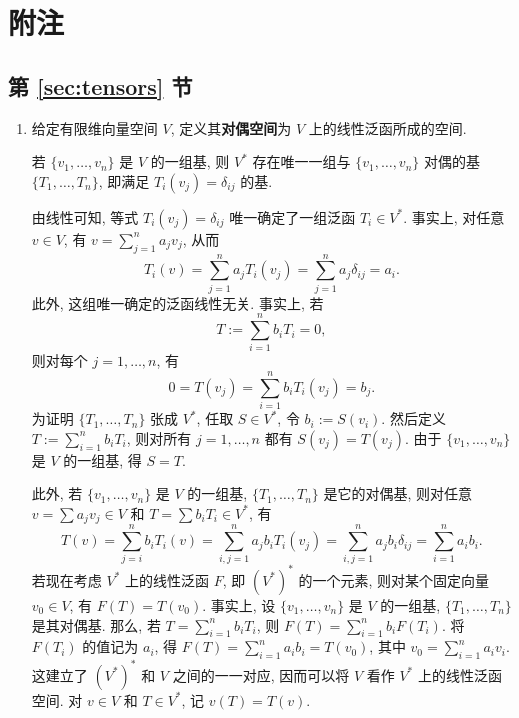 \section{附注}\label{sec:notes-on-differential-forms}

\subsection{第 \ref{sec:tensors} 节}\label{subsec:notes-tensors}
\begin{enumerate}[label=(\arabic*),leftmargin=*]
\item 给定有限维向量空间 $V$, 定义其\textbf{对偶空间}为 $V$ 上的线性泛函所成的空间.

\begin{RiemannProposition}\label{prop:existence-and-uniqueness-of-dual-basis}
若 $\{v_1,\ldots,v_n\}$ 是 $V$ 的一组基, 则 $V^*$ 存在唯一一组与 $\{v_1,\ldots,v_n\}$ 对偶的基 $\{T_1,\ldots,T_n\}$, 即满足 $T_i(v_j)=\delta_{ij}$ 的基.
\end{RiemannProposition}

\begin{RiemannProof}
由线性可知, 等式 $T_i(v_j)=\delta_{ij}$ 唯一确定了一组泛函 $T_i\in V^*$. 事实上, 对任意 $v\in V$, 有 $v=\sum_{j=1}^na_jv_j$, 从而
\[
  T_i(v)=\sum_{j=1}^na_jT_i(v_j)=\sum_{j=1}^na_j\delta_{ij}=a_i.
\]
此外, 这组唯一确定的泛函线性无关. 事实上, 若
\[
  T:=\sum_{i=1}^nb_iT_i=0,
\]
则对每个 $j=1,\ldots,n$, 有
\[
  0=T(v_j)=\sum_{i=1}^nb_iT_i(v_j)=b_j.
\]
为证明 $\{T_1,\ldots,T_n\}$ 张成 $V^*$, 任取 $S\in V^*$, 令 $b_i:=S(v_i)$. 然后定义 $T:=\sum_{i=1}^nb_iT_i$, 则对所有 $j=1,\ldots,n$ 都有 $S(v_j)=T(v_j)$. 由于 $\{v_1,\ldots,v_n\}$ 是 $V$ 的一组基, 得 $S=T$.
\end{RiemannProof}

此外, 若 $\{v_1,\ldots,v_n\}$ 是 $V$ 的一组基, $\{T_1,\ldots,T_n\}$ 是它的对偶基, 则对任意 $v=\sum a_jv_j\in V$ 和 $T=\sum b_iT_i\in V^*$, 有
\[
  T(v)=\sum_{j=i}^nb_iT_i(v)=\sum_{i,j=1}^na_jb_iT_i(v_j)
  =\sum_{i,j=1}^na_jb_i\delta_{ij}=\sum_{i=1}^na_ib_i.
\]
若现在考虑 $V^*$ 上的线性泛函 $F$, 即 $(V^*)^*$ 的一个元素, 则对某个固定向量 $v_0\in V$, 有 $F(T)=T(v_0)$. 事实上, 设 $\{v_1,\ldots,v_n\}$ 是 $V$ 的一组基, $\{T_1,\ldots,T_n\}$ 是其对偶基. 那么, 若 $T=\sum_{i=1}^nb_iT_i$, 则 $F(T)=\sum_{i=1}^nb_iF(T_i)$. 将 $F(T_i)$ 的值记为 $a_i$, 得 $F(T)=\sum_{i=1}^na_ib_i=T(v_0)$, 其中 $v_0=\sum_{i=1}^na_iv_i$. 这建立了 $(V^*)^*$ 和 $V$ 之间的一一对应, 因而可以将 $V$ 看作 $V^*$ 上的线性泛函空间. 对 $v\in V$ 和 $T\in V^*$, 记 $v(T)=T(v)$.


\end{enumerate}
